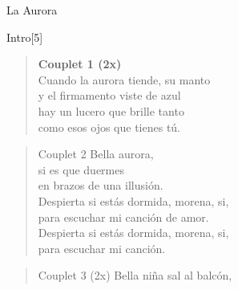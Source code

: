 \begin{song}[vals]{La Aurora}
\begin{instrumental}{Intro}[5]
 \measure{}   \measure{}
\measure{} \measure{} \measure*{} 
\measure{}  
 \measure{} \measure{}  \measure{}
 \measure{}  \measure{}  
\end{instrumental}
\begin{verse}{}
\hspace{-2em}\textbf{Couplet 1 (2x)}\\
Cuando la aurora tiende, su manto\\
y el firmamento viste de azul\hspace{3em}
\\ hay un lucero que brille tanto\\
como esos ojos que tienes tú.\hspace{3em}\\
\end{verse}
\begin{verse}{Couplet 2}
Bella aurora,\\
si es que duermes\\
en brazos de una illusión.\hspace{1em}\\
Despierta si estás dormida, morena, si,\\
para escuchar mi canción de amor.\\
Despierta si estás dormida, morena, si,\\
para escuchar mi canción.\hspace{1em}\hspace{2em}\\
\end{verse}
\vspace{4ex}
\vspace{-1ex}
\begin{verse}{Couplet 3 (2x)}
Bella niña sal al balcón,\\

\end{verse}
\end{song}
